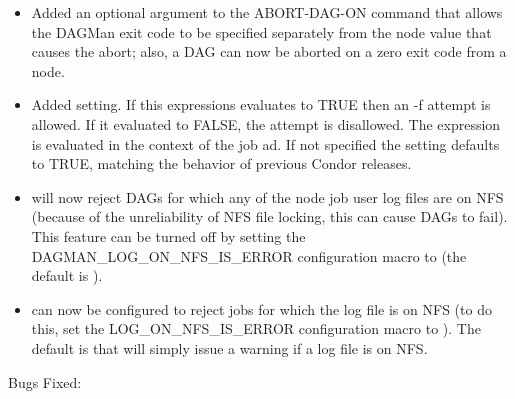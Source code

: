 \begin{itemize}

\item Added an optional argument to the  ABORT-DAG-ON
command that allows the DAGMan exit code to be specified separately
from the node value that causes the abort; also, a DAG can now be
aborted on a zero exit code from a node.

\item Added  setting.  If this expressions evaluates to
TRUE then an  -f attempt is allowed.  If it evaluated to FALSE, the
attempt is disallowed.  The expression is evaluated in the context of the job
ad.  If not specified the setting defaults to TRUE, matching the behavior of
previous Condor releases.

\item {} will now reject DAGs for which any of the node
job user log files are on NFS (because of the unreliability of NFS
file locking, this can cause DAGs to fail).  This feature can be
turned off by setting the DAGMAN\_LOG\_ON\_NFS\_IS\_ERROR configuration
macro to  (the default is ).

\item {} can now be configured to reject jobs for which
the log file is on NFS (to do this, set the LOG\_ON\_NFS\_IS\_ERROR
configuration macro to ).  The default is that 
will simply issue a warning if a log file is on NFS.

\end{itemize}

\noindent Bugs Fixed:

